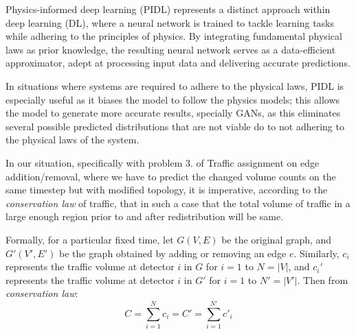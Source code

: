Physics-informed deep learning (PIDL) represents a distinct approach within deep learning (DL), where a neural network is trained to tackle learning tasks while adhering to the principles of physics. By integrating fundamental physical laws as prior knowledge, the resulting neural network serves as a data-efficient approximator, adept at processing input data and delivering accurate predictions.

In situations where systems are required to adhere to the physical laws, PIDL is especially useful as it biases the model to follow the physics models; this allows the model to generate more accurate results, specially GANs, as this eliminates several possible predicted distributions that are not viable do to not adhering to the physical laws of the system.

In our situation, specifically with problem 3. of Traffic assignment on edge addition/removal, where we have to predict the changed volume counts on the same timestep but with modified topology, it is imperative, according to the \textit{conservation law} of traffic, that in such a case that the total volume of traffic in a large enough region prior to and after redistribution will be same.

Formally, for a particular fixed time, let \( G(V, E) \) be the original graph, and \( G'(V', E') \) be the graph obtained by adding or removing an edge \( e \). Similarly, \( c_i \) represents the traffic volume at detector \( i \) in \( G \) for \( i = 1 \) to \( N = |V| \), and \( c_i' \) represents the traffic volume at detector \( i \) in \( G' \) for \( i = 1 \) to \( N' = |V'| \). Then from \textit{conservation law}:
\begin{equation}
    C = \sum_{i=1}^{N} c_i = C' = \sum_{i=1}^{N'} c'_i \tag{5}
\end{equation}

